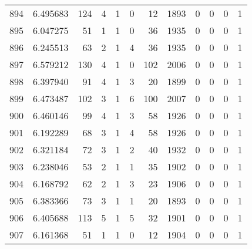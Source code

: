 \begin{tabular}{lrrrrrrrrrrr}
894 &  6.495683 &  124 &      4 &        1 &      0 &              12 &  1893 &               0 &               0 &               0 &               1 \\
895 &  6.047275 &   51 &      1 &        1 &      0 &              36 &  1935 &               0 &               0 &               0 &               1 \\
896 &  6.245513 &   63 &      2 &        1 &      4 &              36 &  1935 &               0 &               0 &               0 &               1 \\
897 &  6.579212 &  130 &      4 &        1 &      0 &             102 &  2006 &               0 &               0 &               0 &               1 \\
898 &  6.397940 &   91 &      4 &        1 &      3 &              20 &  1899 &               0 &               0 &               0 &               1 \\
899 &  6.473487 &  102 &      3 &        1 &      6 &             100 &  2007 &               0 &               0 &               0 &               1 \\
900 &  6.460146 &   99 &      4 &        1 &      3 &              58 &  1926 &               0 &               0 &               0 &               1 \\
901 &  6.192289 &   68 &      3 &        1 &      4 &              58 &  1926 &               0 &               0 &               0 &               1 \\
902 &  6.321184 &   72 &      3 &        1 &      2 &              40 &  1932 &               0 &               0 &               0 &               1 \\
903 &  6.238046 &   53 &      2 &        1 &      1 &              35 &  1902 &               0 &               0 &               0 &               1 \\
904 &  6.168792 &   62 &      2 &        1 &      3 &              23 &  1906 &               0 &               0 &               0 &               1 \\
905 &  6.383366 &   73 &      3 &        1 &      1 &              20 &  1893 &               0 &               0 &               0 &               1 \\
906 &  6.405688 &  113 &      5 &        1 &      5 &              32 &  1901 &               0 &               0 &               0 &               1 \\
907 &  6.161368 &   51 &      1 &        1 &      0 &              12 &  1904 &               0 &               0 &               0 &               1 \\

\end{tabular}
